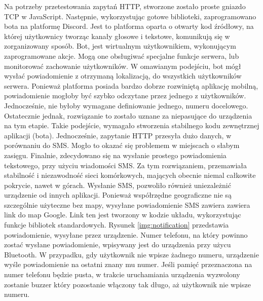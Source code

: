 Na potrzeby przetestowania zapytań HTTP, stworzone zostało proste gniazdo TCP w JavaScript. Następnie, wykorzystując gotowe biblioteki, zaprogramowano bota na platformę Discord. Jest to platforma oparta o otwarty kod źródłowy, na której użytkownicy tworząc kanały głosowe i tekstowe, komunikują się w zorganizowany sposób. Bot, jest wirtualnym użytkownikiem, wykonującym zaprogramowane akcje. Mogą one obsługiwać specjalne funkcje serwera, lub monitorować zachowanie użytkowników. W omawianym podejściu, bot mógł wysłać powiadomienie z otrzymaną lokalizacją, do wszystkich użytkowników serwera. Ponieważ platforma posiada bardzo dobrze rozwiniętą aplikację mobilną, powiadomienie mogłoby być szybko odczytane przez jednego z użytkowników. Jednocześnie, nie byłoby wymagane definiowanie jednego, numeru docelowego. Ostatecznie jednak, rozwiązanie to zostało uznane za niepasujące do urządzenia na tym etapie. Takie podejście, wymagało stworzenia stabilnego kodu zewnętrznej aplikacji (bota). Jednocześnie, zapytanie HTTP przesyła dużo danych, w porównaniu do SMS. Mogło to okazać się problemem w miejscach o słabym zasięgu.
\newline
Finalnie, zdecydowano się na wysłanie prostego powiadomienia tekstowego, przy użyciu wiadomości SMS. Za tym rozwiązaniem, przemawiała stabilność i niezawodność sieci komórkowych, mających obecnie niemal całkowite pokrycie, nawet w górach. Wysłanie SMS, pozwoliło również uniezależnić urządzenie od innych aplikacji.
Ponieważ współrzędne geograficzne nie są szczególnie użyteczne bez mapy, wysyłane powiadomienie SMS zawiera zawiera link do map Google. Link ten jest tworzony w kodzie układu, wykorzystując funkcje bibliotek standardowych. Rysunek \ref{img:notification} przedstawia powiadomienie, wysyłane przez urządzenie. Numer telefonu, na który powinno zostać wysłane powiadomienie, wpisywany jest do urządzenia przy użycu Bluetooth. W przypadku, gdy użytkownik nie wpisze żadnego numeru, urządzenie wyśle powiadomienie na ostatni znany mu numer. Jeśli pamięć przeznaczona na numer telefonu będzie pusta, w trakcie uruchamiania urządzenia wyzwolony zostanie buzzer który pozostanie włączony tak długo, aż użytkownik nie wpisze numeru. %

